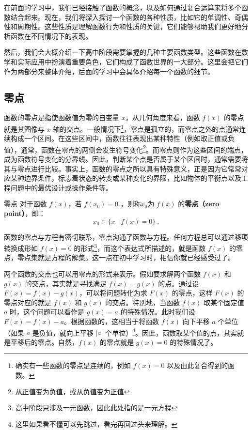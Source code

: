 
\begin{issues}
\issueDraft
\end{issues}


在前面的学习中，我们已经接触了函数的概念，以及如何通过复合运算来将多个函数结合起来。现在，我们将深入探讨一个函数的各种性质，比如它的单调性、奇偶性和周期性。这些性质是理解函数行为和性质的关键，它们能够帮助我们更好地分析函数在不同情况下的表现。

然后，我们会大概介绍一下高中阶段需要掌握的几种主要函数类型。这些函数在数学和实际应用中扮演着重要角色，它们构成了函数世界的一大部分。这里会把它们作为两部分来整体介绍，后面的学习中会具体介绍每一个函数的细节。


\subsection{零点}

函数的零点是指使函数值为零的自变量 $x$，从几何角度来看，函数 $f(x)$ 的零点就是其图像与 $x$ 轴的交点。一般情况下\footnote{确实有一些函数的零点是连续的，例如 $f(x) = 0$ 以及由此复合得到的函数。}，零点是孤立的，而零点之外的点通常连续构成一个区间。在这些区间中，函数往往表现出某种特性（例如取正值或负值），通常，函数在零点的两侧会发生符号变化\footnote{从正值变为负值，或从负值变为正值}。而零点则作为这些区间的端点，成为函数符号变化的分界线。因此，判断某个点是否属于某个区间时，通常需要将其与零点进行比较。事实上，函数的零点之所以具有特殊意义，正是因为它常常对应某种边界条件，标志着状态的转变或某种变化的界限，比如物体的平衡点以及工程问题中的最优设计或操作条件等。

\begin{definition}{零点}
对于函数 $f(x)$，若 $f(x_0) = 0$ ，则称$x_0$为 $f(x)$ 的\textbf{零点（zero point）}，即：
\begin{equation}
x_0 \in \{ x \mid f(x) = 0 \}~.
\end{equation}
\end{definition}

函数的零点与方程有密切联系，零点沟通了函数与方程。任何方程总可以通过移项转换成形如 $f(x) = 0$ 的形式\footnote{高中阶段只涉及一元函数，因此此处指的是一元方程}，而这个表达式所描述的，就是函数 $f(x)$ 的零点，零点集就是方程的解集。这一点在初中学习时，相信你就已经感受过了。

两个函数的交点也可以用零点的形式来表示。假如要求解两个函数 $f(x)$ 和 $g(x)$ 的交点，其实就是寻找满足 $f(x) = g(x)$ 的点。通过设 $F(x) = f(x) - g(x)$，可以将问题转化为求 $F(x)$ 的零点，这样 $F(x)$ 的零点对应的就是 $f(x)$ 和 $g(x)$ 的交点。特别地，当函数 $f(x)$ 取某个固定值 $a$ 时，这个问题可以看作是 $g(x) = a$ 的特殊情况。此时我们设 $F(x) = f(x) - a$。根据函数的，这相当于将函数 $f(x)$ 向下平移 $a$ 个单位（如果 $a$ 是负值，就向上平移 $|a|$ 个单位）\footnote{这里如果看不懂可以先跳过，看完再回过头来理解。}。因此，函数取某个值的点，其实就是平移后的零点。自然，$f(x)$ 的零点就是 $g(x) = 0$ 的特殊情况了。

